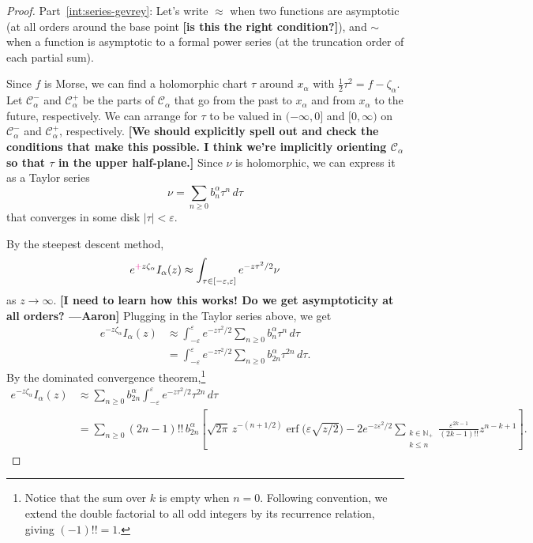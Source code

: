 \documentclass{article}
\theoremstyle{definition}
\begin{document}
\begin{proof}
Part~\eqref{int:series-gevrey}: Let's write $\approx$ when two functions are asymptotic (at all orders around the base point \textbf{[is this the right condition?]}), and $\sim$ when a function is asymptotic to a formal power series (at the truncation order of each partial sum).

Since $f$ is Morse, we can find a holomorphic chart $\tau$ around $x_\alpha$ with $\tfrac{1}{2} \tau^2 = f - \zeta_\alpha$. Let $\mathcal{C}^-_\alpha$ and $\mathcal{C}^+_\alpha$ be the parts of $\mathcal{C}_\alpha$ that go from the past to $x_\alpha$ and from $x_\alpha$ to the future, respectively. We can arrange for $\tau$ to be valued in $(-\infty, 0]$ and $[0, \infty)$ on $\mathcal{C}^-_\alpha$ and $\mathcal{C}^+_\alpha$, respectively. \textbf{[We should explicitly spell out and check the conditions that make this possible. I think we're implicitly orienting $\mathcal{C}_\alpha$ so that $\tau$ in the upper half-plane.]} Since $\nu$ is holomorphic, we can express it as a Taylor series
\[ \nu = \sum_{n \ge 0} b_n^\alpha \tau^n\,d\tau \]
that converges in some disk $|\tau| < \varepsilon$.

By the steepest descent method,
\[ e^{\textcolor{magenta}{+}z\zeta_\alpha} I_\alpha(z) \approx \int_{\tau \in [-\varepsilon, \varepsilon]} e^{-z\tau^2/2} \nu \]
as $z \to \infty$. \textbf{[I need to learn how this works! Do we get asymptoticity at all orders? ---Aaron]} Plugging in the Taylor series above, we get
\begin{align*}
e^{-z\zeta_\alpha} I_\alpha(z) & \approx \int_{-\varepsilon}^\varepsilon e^{-z\tau^2/2} \sum_{n \ge 0} b_n^\alpha \tau^n\,d\tau \\
& = \int_{-\varepsilon}^\varepsilon e^{-z\tau^2/2} \sum_{n \ge 0} b_{2n}^\alpha \tau^{2n}\,d\tau.
\end{align*}
By the dominated convergence theorem,\footnote{Notice that the sum over $k$ is empty when $n = 0$. Following convention, we extend the double factorial to all odd integers by its recurrence relation, giving $(-1)!! = 1$.}
\begin{align*}
e^{-z\zeta_\alpha} I_\alpha(z) & \approx \sum_{n \ge 0} b_{2n}^\alpha \int_{-\varepsilon}^\varepsilon e^{-z\tau^2/2} \tau^{2n}\,d\tau \\
& = \sum_{n \ge 0} (2n-1)!!\,b_{2n}^\alpha \left[ \sqrt{2\pi}\,z^{-(n+1/2)} \operatorname{erf}\big(\varepsilon \sqrt{z/2}\big) - 2e^{-z\varepsilon^2/2} \sum_{\substack{k \in \mathbb{N}_+ \\ k \le n}} \frac{\varepsilon^{2k-1}}{(2k-1)!!} z^{n-k+1} \right].
\end{align*}


\end{proof}
\end{document}
